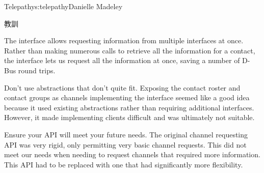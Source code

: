 \begin{aosachapter}{Telepathy}{s:telepathy}{Danielle Madeley}
\begin{aosasect1}{教訓}
\begin{aosadescription}
  \item{The  interface allows requesting information
    from multiple interfaces at once.}  Rather than making numerous
     calls to retrieve all the information for a contact,
    the  interface lets us request all the information
    at once, saving a number of D-Bus round trips.

  \item{Don't use abstractions that don't quite fit.}  Exposing the
    contact roster and contact groups as channels implementing the
     interface seemed like a good idea because it used
    existing abstractions rather than requiring additional
    interfaces. However, it made implementing clients difficult and
    was ultimately not suitable.

  \item{Ensure your API will meet your future needs.}  The original
    channel requesting API was very rigid, only permitting very basic
    channel requests. This did not meet our needs when needing to
    request channels that required more information. This API had to
    be replaced with one that had significantly more flexibility.

\end{aosadescription}

\end{aosasect1}

\end{aosachapter}
